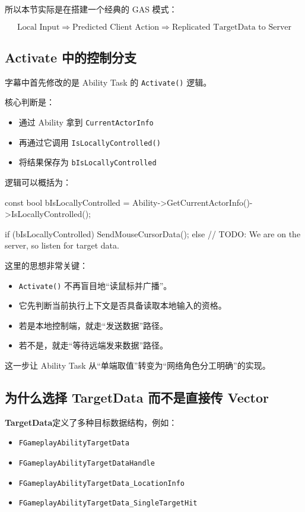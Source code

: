 \documentclass[10pt,CJKmath]{ctexart}
\begin{document}
所以本节实际是在搭建一个经典的 GAS 模式：

\[
\text{Local Input} \Rightarrow \text{Predicted Client Action} \Rightarrow \text{Replicated TargetData to Server}
\]

\subsection{Activate 中的控制分支}

字幕中首先修改的是 Ability Task 的 \texttt{Activate()} 逻辑。

核心判断是：

\begin{itemize}
	\item 通过 Ability 拿到 \texttt{CurrentActorInfo}
	\item 再通过它调用 \texttt{IsLocallyControlled()}
	\item 将结果保存为 \texttt{bIsLocallyControlled}
\end{itemize}

逻辑可以概括为：

\begin{code}
const bool bIsLocallyControlled = Ability->GetCurrentActorInfo()->IsLocallyControlled();
	
if (bIsLocallyControlled)
{
	SendMouseCursorData();
}
else
{
	// TODO: We are on the server, so listen for target data.
}
\end{code}

这里的思想非常关键：

\begin{itemize}
	\item \texttt{Activate()} 不再盲目地“读鼠标并广播”。
	\item 它先判断当前执行上下文是否具备读取本地输入的资格。
	\item 若是本地控制端，就走“发送数据”路径。
	\item 若不是，就走“等待远端发来数据”路径。
\end{itemize}

这一步让 Ability Task 从“单端取值”转变为“网络角色分工明确”的实现。

\subsection{为什么选择 TargetData 而不是直接传 Vector}

\textbf{ TargetData}定义了多种目标数据结构，例如：

\begin{itemize}
	\item \texttt{FGameplayAbilityTargetData}
	\item \texttt{FGameplayAbilityTargetDataHandle}
	\item \texttt{FGameplayAbilityTargetData\_LocationInfo}
	\item \texttt{FGameplayAbilityTargetData\_SingleTargetHit}
\end{itemize}
\end{document}
